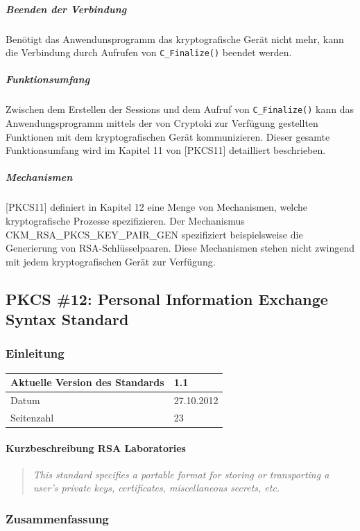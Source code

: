 \documentclass[10pt,a4paper]{article}
\begin{document}
\subparagraph{Beenden der Verbindung}
Benötigt das Anwendunsprogramm das kryptografische Gerät nicht mehr, kann die Verbindung
durch Aufrufen von \texttt{C\_Finalize()} beendet werden.

\subparagraph{Funktionsumfang}
Zwischen dem Erstellen der Sessions und dem Aufruf von \texttt{C\_Finalize()} kann das
Anwendungsprogramm mittels der von Cryptoki zur Verfügung gestellten Funktionen mit dem
kryptografischen Gerät kommunizieren. Dieser gesamte Funktionsumfang wird im Kapitel 11
von [PKCS11] detailliert beschrieben.

\subparagraph{Mechanismen}
[PKCS11] definiert in Kapitel 12 eine Menge von Mechanismen, welche kryptografische
Prozesse spezifizieren. Der Mechanismus \\
CKM\_RSA\_PKCS\_KEY\_PAIR\_GEN spezifiziert
beispielsweise die Generierung von RSA-Schlüsselpaaren. Diese Mechanismen stehen nicht
zwingend mit jedem kryptografischen Gerät zur Verfügung.

\subsection{PKCS \#12: Personal Information Exchange Syntax Standard}

\subsubsection{Einleitung}

\begin{table}[ht]
    \centering
    \begin{tabular}{|l|l|} \hline
        Aktuelle Version des Standards & 1.1 \\\hline
        Datum & 27.10.2012 \\\hline
        Seitenzahl & 23 \\\hline
    \end{tabular}
\end{table}

\paragraph{Kurzbeschreibung RSA Laboratories}
\begin{quotation}
    \itshape This standard specifies a portable format for storing or transporting a
    user's private keys, certificates, miscellaneous secrets, etc.
\end{quotation}

\subsubsection{Zusammenfassung}
\end{document}
